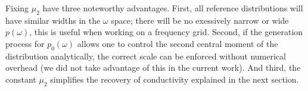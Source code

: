 \documentclass[notitlepage,11pt,nofootinbib]{revtex4-1}
\begin{document}
Fixing $\mu_2$ have three noteworthy advantages. First, all reference distributions will have similar widths in the $\omega$ space; there will be no exessively narrow or wide $p(\omega)$, this is useful when working on a frequency grid. 
Second, if the generation process for $p_0(\omega)$ allows one to control the second central moment of the distribution analytically, the correct scale can be enforced without numerical overhead (we did not take advantage of this in the current work).
And third, the constant $\mu_2$ simplifies the recovery of conductivity explained in the next section.

\end{document}

